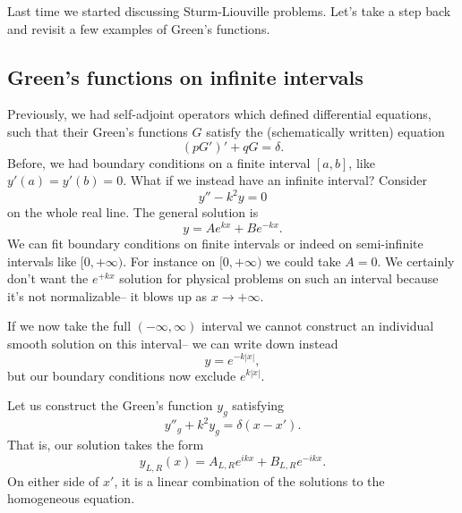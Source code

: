 Last time we started discussing Sturm-Liouville problems. Let's take a step back and revisit a few examples of Green's functions.

\subsection*{Green's functions on infinite intervals}
Previously, we had self-adjoint operators which defined differential equations, such that their Green's functions $G$ satisfy the (schematically written) equation
\begin{equation}
    (pG')' + q G  = \delta.
\end{equation}
Before, we had boundary conditions on a finite interval $[a,b]$, like $y'(a)=y'(b)=0$. What if we instead have an infinite interval? Consider
\begin{equation}
    y''-k^2 y =0
\end{equation}
on the whole real line. The general solution is
\begin{equation}
    y=Ae^{kx} + Be^{-kx}.
\end{equation}
We can fit boundary conditions on finite intervals or indeed on semi-infinite intervals like $[0,+\infty)$. For instance on $[0,+\infty)$ we could take $A=0$. We certainly don't want the $e^{+kx}$ solution for physical problems on such an interval because it's not normalizable-- it blows up as $x\to +\infty$.

If we now take the full $(-\infty,\infty)$ interval we cannot construct an individual smooth solution on this interval-- we can write down instead
\begin{equation}
    y=e^{-k|x|},
\end{equation}
but our boundary conditions now exclude $e^{k|x|}$.

Let us construct the Green's function $y_g$ satisfying
\begin{equation}\label{waveeqn_green}
    y''_g + k^2 y_g =\delta(x-x').
\end{equation}
That is, our solution takes the form
\begin{equation}
    y_{L,R}(x) = A_{L,R} e^{ikx} + B_{L,R} e^{-ikx}.
\end{equation}
On either side of $x'$, it is a linear combination of the solutions to the homogeneous equation.

